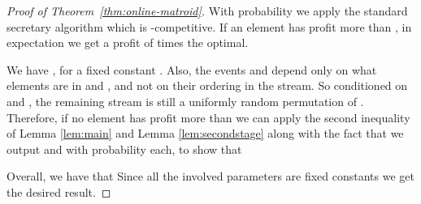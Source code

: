 \begin{proof}[Proof of Theorem~\ref{thm:online-matroid}]
With probability  we apply the standard secretary algorithm which is 
-competitive. If an element has profit more than
, in expectation we get a profit of
 times the optimal.

We have , for a fixed constant . Also, the events  and  
depend only on what elements are in  and , 
and not on their ordering in the stream. So conditioned on 
and , the remaining stream is still a uniformly random
permutation of . Therefore, if no element has profit more than
 we can apply the second inequality
of Lemma \ref{lem:main} and Lemma \ref{lem:secondstage} along with the
fact that we output  and  with probability 
each,  to show that


Overall, we have that  Since all the involved
parameters are fixed constants we get the desired result.
\end{proof}
















































